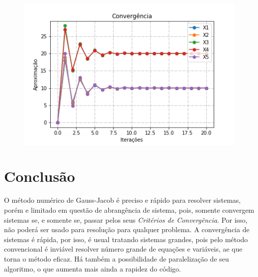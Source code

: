 \documentclass[
12pt,				%
openright,			%
twoside,			%
a4paper,			%
english,			%
french,				%
spanish,			%
brazil				%
]{abntex2_new}
\begin{document}
\begin{alineas}
			\begin{figure}[htb]
				\includegraphics[scale=1]{grafico2.png}
			\end{figure}
		\end{alineas}
		
		\chapter{Conclusão}
		
		O método numérico de Gauss-Jacob é preciso e rápido para resolver sistemas,
		porém e limitado
		em questão de abrangência de sistema, pois, somente convergem sistemas se, e
		somente se, passar pelos seus \textit{Critérios de Convergência}. Por isso, não
		poderá ser usado
		para resolução para qualquer problema. A convergência de sistemas é rápida, por
		isso, é usual
		tratando sistemas grandes, pois pelo método convencional é inviável resolver
		número grande de equações
		e variáveis, ae que torna o método eficaz. Há também a possibilidade de
		paralelização de seu algoritmo, o que aumenta mais ainda a rapidez do código.
		
		
		
	
\end{document}
